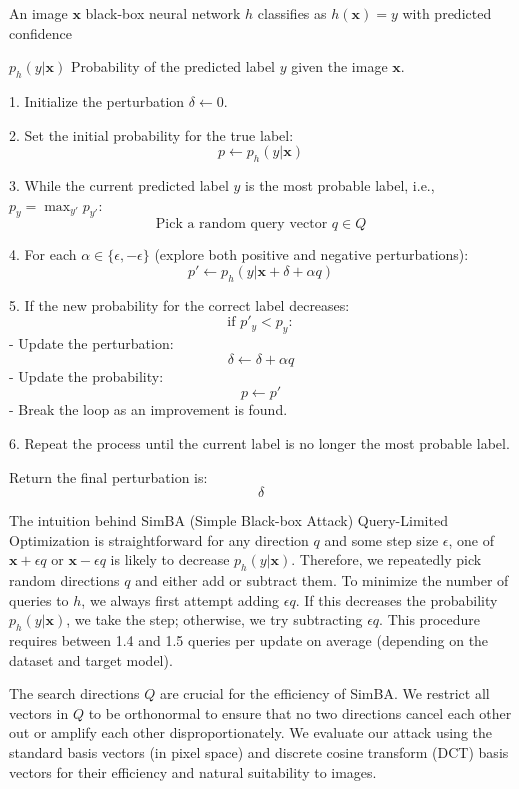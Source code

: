 
An image $\mathbf{x}$ 
 black-box neural network $h$ classifies as $h(\mathbf{x}) = y$ with predicted confidence

$p_h(y | \mathbf{x})$ Probability of the predicted label $y$ given the image $\mathbf{x}$.

1. Initialize the perturbation $\delta \leftarrow 0$.

2. Set the initial probability for the true label: 
\[
p \leftarrow p_h(y | \mathbf{x})
\]

3. While the current predicted label $y$ is the most probable label, i.e., $p_y = \max_{y'} p_{y'}$:
\[
\text{Pick a random query vector } q \in Q
\]

4. For each $\alpha \in \{\epsilon, -\epsilon\}$ (explore both positive and negative perturbations):
\[
p' \leftarrow p_h(y | \mathbf{x} + \delta + \alpha q)
\]

5. If the new probability for the correct label decreases:
\[
\text{if } p'_y < p_y:
\]
    - Update the perturbation:
    \[
    \delta \leftarrow \delta + \alpha q
    \]
    - Update the probability:
    \[
    p \leftarrow p'
    \]
    - Break the loop as an improvement is found.

6. Repeat the process until the current label is no longer the most probable label.

Return the final perturbation is:
\[
\delta
\]

The intuition behind SimBA (Simple Black-box Attack) Query-Limited Optimization is straightforward for any direction $q$ and some step size $\epsilon$, one of $\mathbf{x} + \epsilon q$ or $\mathbf{x} - \epsilon q$ is likely to decrease $p_h(y | \mathbf{x})$. Therefore, we repeatedly pick random directions $q$ and either add or subtract them. To minimize the number of queries to $h$, we always first attempt adding $\epsilon q$. If this decreases the probability $p_h(y | \mathbf{x})$, we take the step; otherwise, we try subtracting $\epsilon q$. This procedure requires between 1.4 and 1.5 queries per update on average (depending on the dataset and target model).

The search directions $Q$ are crucial for the efficiency of SimBA. We restrict all vectors in $Q$ to be orthonormal to ensure that no two directions cancel each other out or amplify each other disproportionately. We evaluate our attack using the standard basis vectors (in pixel space) and discrete cosine transform (DCT) basis vectors for their efficiency and natural suitability to images.

